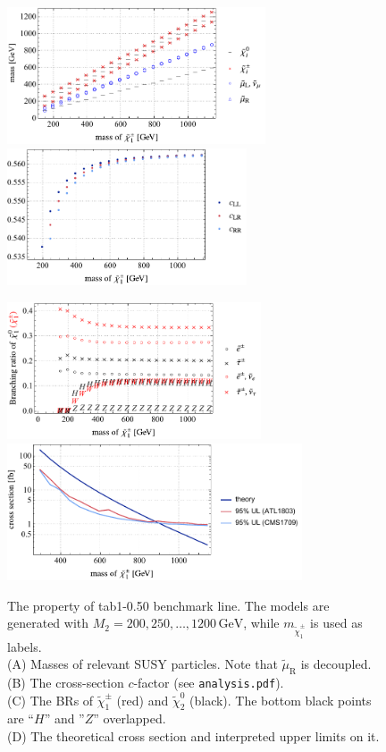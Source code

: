 \documentclass[a4paper,10pt,captions=tableheading,DIV=14]{scrartcl}
\numberwithin{equation}{section}
\newcommand\w[1]{_{\mathrm{#1}}}
\newcommand\unit[1]{\,\mathrm{#1}\xspace}
\newcommand\GeV{\unit{GeV}}
\newcommand\neut  [1][\relax]{{\tilde\chi^0_{#1}}}
\newcommand\charPM[1][\relax]{{\tilde\chi^\pm_{#1}}}
\begin{document}
\begin{figure}[h]
  \centering
  \includegraphics[height=115pt]{../plots/plot_tab1x050_mass.pdf}
  \includegraphics[height=115pt]{../plots/plot_tab1x050_cfactors.pdf}
\par
  \includegraphics[height=115pt]{../plots/plot_tab1x050_br21.pdf}
  \includegraphics[height=115pt]{../plots/plot_tab1x050_limit.pdf}

  \caption{\label{fig:tab1x050}The property of tab1-0.50 benchmark line. The models are generated with $M_2=200,250,\dots,1200\GeV$, while $m_{\charPM[1]}$ is used as labels.\\
 (A) Masses of relevant SUSY particles. Note that $\tilde\mu\w R$ is decoupled.\\
 (B) The cross-section $c$-factor (see \texttt{analysis.pdf}).\\
 (C) The BRs of $\charPM[1]$ (red) and $\neut[2]$ (black). The bottom black points are ``$H$'' and ''$Z$'' overlapped.\\
 (D) The theoretical cross section and interpreted upper limits on it.
}
\end{figure}
\end{document}

